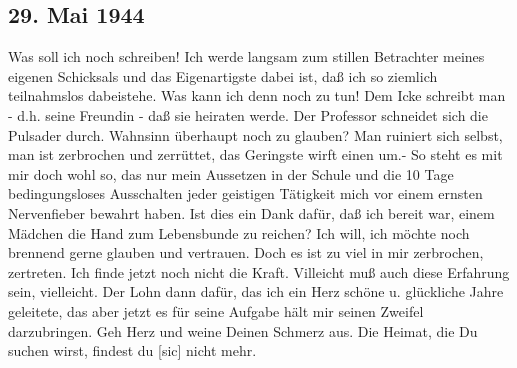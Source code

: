 \subsection{29. Mai 1944}

Was soll ich noch schreiben!
Ich werde langsam zum stillen Betrachter meines eigenen Schicksals und das Eigenartigste dabei ist, da{\ss} ich so ziemlich teilnahmslos dabeistehe.
Was kann ich denn noch zu tun!
Dem Icke schreibt man - d.h. seine Freundin - da{\ss} sie heiraten werde.
Der Professor schneidet sich die Pulsader durch.
Wahnsinn \"{u}berhaupt noch zu glauben?
Man ruiniert sich selbst, man ist zerbrochen und zerr\"{u}ttet, das Geringste wirft einen um.-
So steht es mit mir doch wohl so, das nur mein Aussetzen in der Schule und die 10 Tage bedingungsloses Ausschalten jeder geistigen T\"{a}tigkeit mich vor einem ernsten Nervenfieber bewahrt haben.
Ist dies ein Dank daf\"{u}r, da{\ss} ich bereit war, einem M\"{a}dchen die Hand zum Lebensbunde zu reichen?
Ich will, ich m\"{o}chte noch brennend gerne glauben und vertrauen.
Doch es ist zu viel in mir zerbrochen, zertreten.
Ich finde jetzt noch nicht die Kraft.
Villeicht mu{\ss} auch diese Erfahrung sein, vielleicht.
Der Lohn dann daf\"{u}r, das ich ein Herz sch\"{o}ne u. gl\"{u}ckliche Jahre geleitete, das aber jetzt es f\"{u}r seine Aufgabe h\"{a}lt mir seinen Zweifel darzubringen.
Geh Herz und weine Deinen Schmerz aus.
Die Heimat, die Du suchen wirst, findest du{\color{red} [sic] } nicht mehr.

\clearpage
